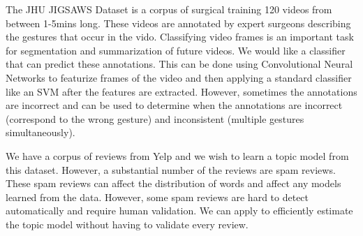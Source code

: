 \begin{example}
The JHU JIGSAWS Dataset is a corpus of surgical training 120 videos from between 1-5mins long.
These videos are annotated by expert surgeons describing the gestures that occur in the vido. 
Classifying video frames is an important task for segmentation and summarization of future videos.
We would like a classifier that can predict these annotations.
This can be done using Convolutional Neural Networks to featurize frames of the video and then applying a standard classifier like an SVM after the features are extracted.
However, sometimes the annotations are incorrect and \sys can be used to determine when the annotations are incorrect (correspond to the wrong gesture) and inconsistent (multiple gestures simultaneously).
\end{example}

\begin{example}
We have a corpus of reviews from Yelp and we wish to learn a topic model from this dataset.
However, a substantial number of the reviews are spam reviews.
These spam reviews can affect the distribution of words and affect any models learned from the data.
However, some spam reviews are hard to detect automatically and require human validation.
We can apply \sys to efficiently estimate the topic model without having to validate every review.
\end{example}
 









